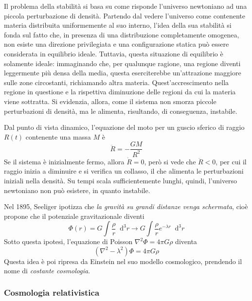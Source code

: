 \documentclass[11pt, a4paper]{scrartcl}
\theoremstyle{style}
\theoremstyle{style1}
\newcommand{\dd}{\mathop{}\!\mathrm{d}}
\numberwithin{equation}{subsection}
\begin{document}
Il problema della stabilit\`a si basa su come risponde l'universo newtoniano ad una piccola perturbazione di densit\`a.
Partendo dal vedere l'universo come contenente materia distribuita uniformemente al suo interno, l'idea della sua stabilit\`a si fonda sul fatto che, in presenza di una distribuzione completamente omogenea, non esiste una direzione privilegiata e una configurazione statica pu\`o essere considerata in equilibrio ideale.
Tuttavia, questa situazione di equilibrio \`e solamente ideale: immaginando che, per qualunque ragione, una regione diventi leggermente pi\`u densa della media, questa eserciterebbe un'attrazione maggiore sulle zone circostanti, richiamando altra materia.
Quest'accrescimento nella regione in questione e la rispettiva diminuzione delle regioni da cui la materia viene sottratta.
Si evidenzia, allora, come il sistema non smorza piccole perturbazioni di densit\`a, ma le alimenta, risultando, di conseguenza, instabile.

Dal punto di vista dinamico, l'equazione del moto per un guscio sferico di raggio $R(t)$ contenente una massa $M$ \`e
\[
\ddot{R} = - \frac{GM}{R^2}
\] 
Se il sistema \`e inizialmente fermo, allora $\dot{R} = 0$, per\`o si vede che $\ddot{R} < 0$, per cui il raggio inizia a diminuire e si verifica un collasso, il che alimenta le perturbazioni iniziali nella densit\`a.
Su tempi scala sufficientemente lunghi, quindi, l'universo newtoniano non pu\`o esistere, in quanto instabile.

Nel 1895, Seeliger ipotizza che \textit{la gravit\`a su grandi distanze venga schermata}, cio\`e propone che il potenziale gravitazionale diventi
\[
\Phi(r)  = G \int \frac{\rho}{r} \dd ^3 r \longrightarrow G \int \frac{\rho }{r} e^{-\lambda r}\dd ^3r
\] 
Sotto questa ipotesi, l'equazione di Poisson $\nabla ^2 \Phi = 4 \pi G \rho  $ diventa 
\[
	(\nabla^2 - \lambda^2) \Phi = 4 \pi G \rho 
\] 
Questa idea \`e poi ripresa da Einstein nel suo modello cosmologico, prendendo il nome di \textit{costante cosmologia}.

\subsubsection{Cosmologia relativistica}
\end{document}
